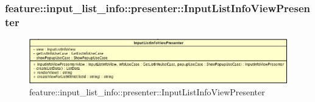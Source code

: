 \subsubsection{feature::input\_list\_info::presenter::InputListInfoViewPresenter}

\label{feature::input\_list\_info::presenter::InputListInfoViewPresenter}
\begin{figure}[ht]
	\centering
	\includegraphics[scale=0.5]{Sezioni/SottosezioniST/img/app/InputListInfoViewPresenter.png}
	\caption{feature::input\_list\_info::presenter::InputListInfoViewPresenter}
\end{figure}

